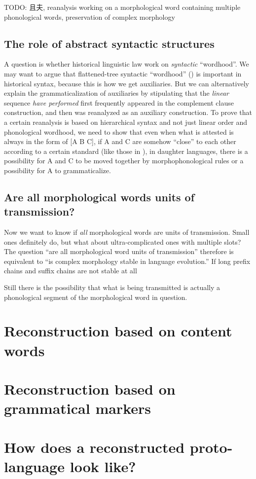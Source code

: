 \documentclass[a4paper, oneside, scheme=plain, 12pt]{article}
\newcommand{\form}[1]{\emph{#1}}
\begin{document}
TODO: 且夫, reanalysis working on a morphological word containing multiple phonological words, preservation of complex morphology

\subsection{The role of abstract syntactic structures}

A question is whether historical linguistic law work on \emph{syntactic} ``wordhood''.
We may want to argue that flattened-tree syntactic ``wordhood'' ()
is important in historical syntax,
because this is how we get auxiliaries.
But we can alternatively explain the grammaticalization of auxiliaries
by stipulating that the \emph{linear} sequence \form{have performed} first frequently appeared
in the complement clause construction,
and then was reanalyzed as an auxiliary construction.
To prove that a certain reanalysis is based on hierarchical syntax and not just linear order and phonological wordhood,
we need to show that even when what is attested is always in the form of [A B C],
if A and C are somehow ``close'' to each other according to a certain standard
(like those in ),
in daughter languages,
there is a possibility for A and C to be moved together by morphophonological rules
or a possibility for A to grammaticalize. 

\subsection{Are all morphological words units of transmission?}

Now we want to know if \emph{all} morphological words are units of transmission.
Small ones definitely do, but what about ultra-complicated ones with multiple slots?
The question ``are all morphological word units of transmission'' therefore is equivalent to 
``is complex morphology stable in language evolution.''
If long prefix chains and suffix chains are not stable at all

Still there is the possibility that what is being transmitted is actually
a phonological segment of the morphological word in question.

\section{Reconstruction based on content words}

\section{Reconstruction based on grammatical markers}

\section{How does a reconstructed proto-language look like?}

\printbibliography
\end{document}
